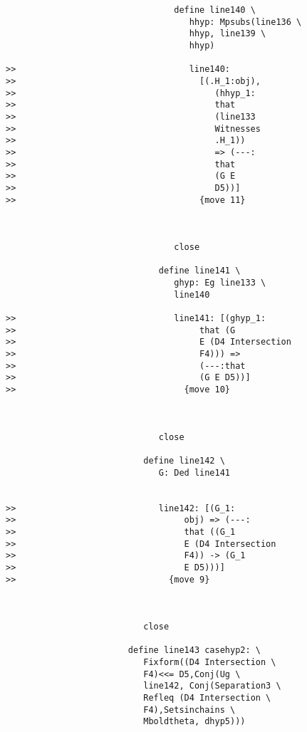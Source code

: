\documentclass[12pt]{article}
\begin{document}
\begin{verbatim}
                                 define line140 \
                                    hhyp: Mpsubs(line136 \
                                    hhyp, line139 \
                                    hhyp)

>>                                  line140:
>>                                    [(.H_1:obj),
>>                                       (hhyp_1:
>>                                       that
>>                                       (line133
>>                                       Witnesses
>>                                       .H_1))
>>                                       => (---:
>>                                       that
>>                                       (G E
>>                                       D5))]
>>                                    {move 11}



                                 close

                              define line141 \
                                 ghyp: Eg line133 \
                                 line140

>>                               line141: [(ghyp_1:
>>                                    that (G
>>                                    E (D4 Intersection
>>                                    F4))) =>
>>                                    (---:that
>>                                    (G E D5))]
>>                                 {move 10}



                              close

                           define line142 \
                              G: Ded line141


>>                            line142: [(G_1:
>>                                 obj) => (---:
>>                                 that ((G_1
>>                                 E (D4 Intersection
>>                                 F4)) -> (G_1
>>                                 E D5)))]
>>                              {move 9}



                           close

                        define line143 casehyp2: \
                           Fixform((D4 Intersection \
                           F4)<<= D5,Conj(Ug \
                           line142, Conj(Separation3 \
                           Refleq (D4 Intersection \
                           F4),Setsinchains \
                           Mboldtheta, dhyp5)))



\end{verbatim}
\end{document}
